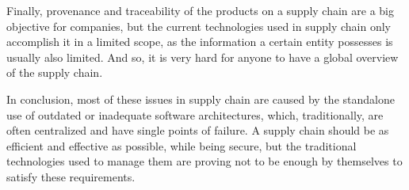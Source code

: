 Finally, provenance and traceability of the products on a supply chain are a big objective for companies, but the current technologies used in supply chain only accomplish it in a limited scope, as the information a certain entity possesses is usually also limited. And so, it is very hard for anyone to have a global overview of the supply chain.

In conclusion, most of these issues in supply chain are caused by the standalone use of outdated or inadequate software architectures, which, traditionally, are often centralized and have single points of failure. A supply chain should be as efficient and effective as possible, while being secure, but the traditional technologies used to manage them are proving not to be enough by themselves to satisfy these requirements.